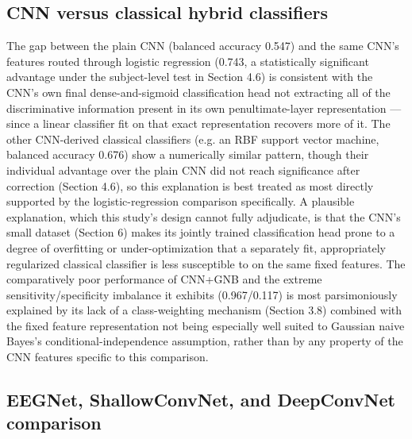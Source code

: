 \documentclass[a4paper,fleqn]{cas-sc}
\begin{document}
\subsection{CNN versus classical hybrid classifiers}

The gap between the plain CNN (balanced accuracy 0.547) and the same CNN's features routed through logistic regression (0.743, a statistically significant advantage under the subject-level test in Section 4.6) is consistent with the CNN's own final dense-and-sigmoid classification head not extracting all of the discriminative information present in its own penultimate-layer representation --- since a linear classifier fit on that exact representation recovers more of it. The other CNN-derived classical classifiers (e.g. an RBF support vector machine, balanced accuracy 0.676) show a numerically similar pattern, though their individual advantage over the plain CNN did not reach significance after correction (Section 4.6), so this explanation is best treated as most directly supported by the logistic-regression comparison specifically. A plausible explanation, which this study's design cannot fully adjudicate, is that the CNN's small dataset (Section 6) makes its jointly trained classification head prone to a degree of overfitting or under-optimization that a separately fit, appropriately regularized classical classifier is less susceptible to on the same fixed features. The comparatively poor performance of CNN+GNB and the extreme sensitivity/specificity imbalance it exhibits (0.967/0.117) is most parsimoniously explained by its lack of a class-weighting mechanism (Section 3.8) combined with the fixed feature representation not being especially well suited to Gaussian naive Bayes's conditional-independence assumption, rather than by any property of the CNN features specific to this comparison.



\subsection{EEGNet, ShallowConvNet, and DeepConvNet comparison}
\end{document}
